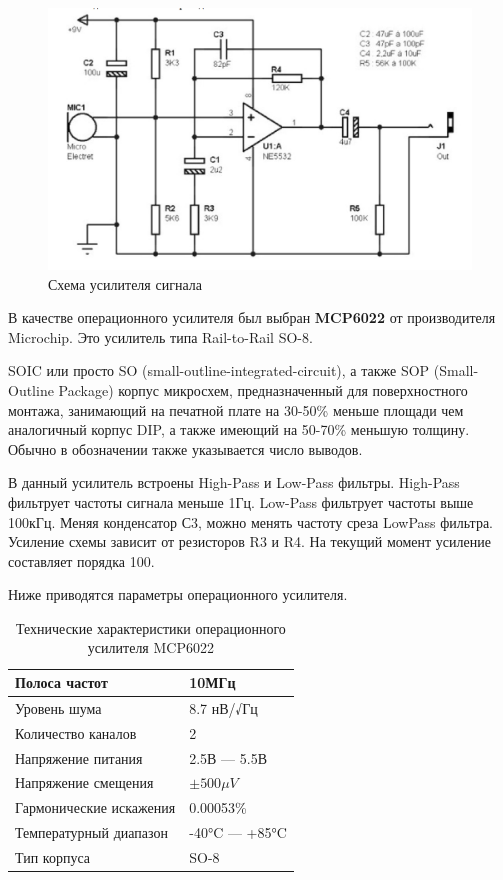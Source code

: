 \documentclass[14pt]{extarticle}
\begin{document}
\begin{figure}[H]
\centering
\includegraphics[width=14cm]{images/circuit.jpg}
\caption{Схема усилителя сигнала}
\end{figure}

В качестве операционного усилителя был выбран \textbf{MCP6022} от производителя Microchip. Это усилитель типа Rail-to-Rail SO-8.

SOIC или просто SO (small-outline-integrated-circuit), а также SOP (Small-Outline Package) корпус микросхем, предназначенный для поверхностного монтажа, занимающий на печатной плате на 30-50\% меньше площади чем аналогичный корпус DIP, а также имеющий на 50-70\% меньшую толщину. Обычно в обозначении также указывается число выводов.

В данный усилитель встроены High-Pass и Low-Pass фильтры. High-Pass фильтрует частоты сигнала меньше 1Гц. Low-Pass фильтрует частоты выше 100кГц. Меняя конденсатор С3, можно менять частоту среза LowPass фильтра. Усиление схемы зависит от резисторов R3 и R4. На текущий момент усиление составляет порядка 100.

Ниже приводятся параметры операционного усилителя.

\begin{table}[h]
\centering
\label{my-label}
\begin{tabular}{|l|l|}
\hline
Полоса частот                  & 10МГц                      \\ \hline
Уровень шума                   & 8.7 нВ/√Гц                 \\ \hline
Количество каналов             & 2                          \\ \hline
Напряжение питания             & 2.5В --- 5.5В              \\ \hline
Напряжение смещения            & $\pm500\mu V $             \\ \hline
Гармонические искажения        & 0.00053\%                  \\ \hline
Температурный диапазон         & -40°C --- +85°C            \\ \hline
Тип корпуса                    & SO-8                       \\ \hline
\end{tabular}
\caption{Технические характеристики операционного усилителя MCP6022}
\end{table}
\end{document}
